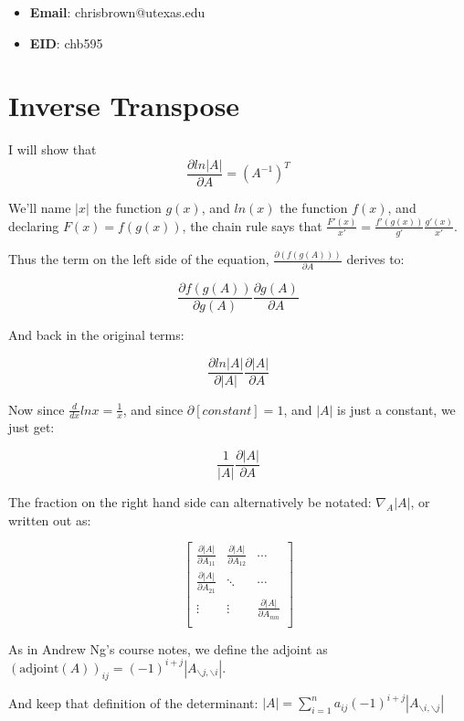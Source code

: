 \documentclass[11pt]{report}
\begin{document}
\begin{itemize}
  \item \textbf{Email}: chrisbrown@utexas.edu
  \item \textbf{EID}: chb595
\end{itemize}

\section{Inverse Transpose}

I will show that
\[ \frac{ \partial ln|A| }{ \partial A } = (A^{-1})^T \]



We'll name $|x|$ the function $g(x)$, and $ln(x)$ the function $f(x)$, and declaring $F(x) = f(g(x))$, the chain rule says that $\frac{F'(x)}{x'} = \frac{f'(g(x))}{g'} \frac{g'(x)}{x'}$.

Thus the term on the left side of the equation, $\frac{\partial(f(g(A)))}{\partial A}$ derives to:

\[ \frac{\partial f(g(A))}{\partial g(A)} \frac{\partial g(A)}{\partial A} \]

And back in the original terms:

\[ \frac{\partial ln|A|}{\partial |A|} \frac{\partial |A|}{\partial A} \]

Now since $\frac{d}{dx} ln x = \frac{1}{x}$, and since $\partial [constant] = 1$, and $|A|$ is just a constant, we just get:

\[ \frac{1}{|A|} \frac{\partial |A|}{\partial A} \]

The fraction on the right hand side can alternatively be notated: $\nabla_A |A|$, or written out as:

\[
\begin{bmatrix}
  \frac{\partial |A|}{\partial A_{11}} & \frac{\partial |A|}{\partial A_{12}} & \cdots \\
  \frac{\partial |A|}{\partial A_{21}} & \ddots & \cdots \\
  \vdots & \vdots & \frac{\partial |A|}{\partial A_{mn}} \\
\end{bmatrix}
\]

As in Andrew Ng's course notes, we define the adjoint as
$(\text{adjoint}(A))_{ij} = (-1)^{i+j}|A_{\backslash j,\backslash i}|$.

And keep that definition of the determinant:
$|A| = \sum^n_{i=1} a_{ij} (-1)^{i+j}|A_{\backslash i,\backslash j}|$
\end{document}
